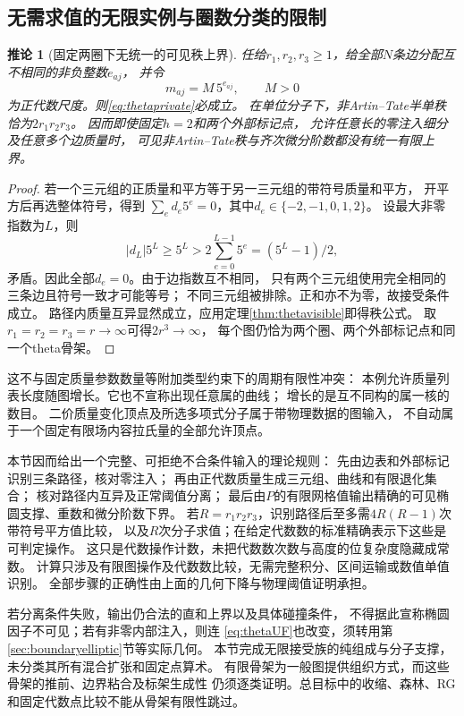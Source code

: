 \documentclass[11pt,a4paper]{ctexart}
\theoremstyle{cnplain}\newtheorem{theorem}{定理}[section]
\newtheorem{corollary}[theorem]{推论}
\theoremstyle{definition}\newtheorem{definition}[theorem]{定义}
\theoremstyle{remark}\newtheorem{remark}[theorem]{注}
\begin{document}
\subsection{无需求值的无限实例与圈数分类的限制}
\begin{corollary}[固定两圈下无统一的可见秩上界]\label{cor:thetaunbounded}
任给$r_1,r_2,r_3\ge1$，给全部$N$条边分配互不相同的非负整数$e_{aj}$，
并令
\[
                    m_{aj}=M\,5^{e_{aj}},\qquad M>0
\]
为正代数尺度。则\eqref{eq:thetaprivate}必成立。
在单位分子下，非Artin--Tate半单秩恰为$2r_1r_2r_3$。
因而即使固定$h=2$和两个外部标记点，
允许任意长的零注入细分及任意多个边质量时，
可见非Artin--Tate秩与齐次微分阶数都没有统一有限上界。
\end{corollary}
\begin{proof}
若一个三元组的正质量和平方等于另一三元组的带符号质量和平方，
开平方后再选整体符号，得到
$\sum_e d_e5^e=0$，其中$d_e\in\{-2,-1,0,1,2\}$。
设最大非零指数为$L$，则
\[
 |d_L|5^L\ge5^L>
       2\sum_{e=0}^{L-1}5^e=(5^L-1)/2,
\]
矛盾。因此全部$d_e=0$。由于边指数互不相同，
只有两个三元组使用完全相同的三条边且符号一致才可能等号；
不同三元组被排除。正和亦不为零，故接受条件成立。
路径内质量互异显然成立，应用定理\ref{thm:thetavisible}即得秩公式。
取$r_1=r_2=r_3=r\to\infty$可得$2r^3\to\infty$，
每个图仍恰为两个圈、两个外部标记点和同一个theta骨架。
\end{proof}

这不与固定质量参数数量等附加类型约束下的周期有限性冲突：
本例允许质量列表长度随图增长。它也不宣称出现任意属的曲线；
增长的是互不同构的属一核的数目。
二价质量变化顶点及所选多项式分子属于带物理数据的图输入，
不自动属于一个固定有限场内容拉氏量的全部允许顶点。

本节因而给出一个完整、可拒绝不合条件输入的理论规则：
先由边表和外部标记识别三条路径，核对零注入；
再由正代数质量生成三元组、曲线和有限退化集合；
核对路径内互异及正常阈值分离；
最后由$P$的有限网格值输出精确的可见椭圆支撑、重数和微分阶数下界。
若$R=r_1r_2r_3$，识别路径后至多需$4R(R-1)$次带符号平方值比较，
以及$R$次分子求值；在给定代数数的标准精确表示下这些是可判定操作。
这只是代数操作计数，未把代数数次数与高度的位复杂度隐藏成常数。
计算只涉及有限图操作及代数数比较，无需完整积分、区间运输或数值单值识别。
全部步骤的正确性由上面的几何下降与物理阈值证明承担。

若分离条件失败，输出仍合法的直和上界以及具体碰撞条件，
不得据此宣称椭圆因子不可见；若有非零内部注入，则连
\eqref{eq:thetaUF}也改变，须转用第\ref{sec:boundaryelliptic}节等实际几何。
本节完成无限接受族的纯组成与分子支撑，未分类其所有混合扩张和固定点算术。
有限骨架为一般图提供组织方式，而这些骨架的推前、边界粘合及标架生成性
仍须逐类证明。总目标中的收缩、森林、RG和固定代数点比较不能从骨架有限性跳过。
\end{document}
